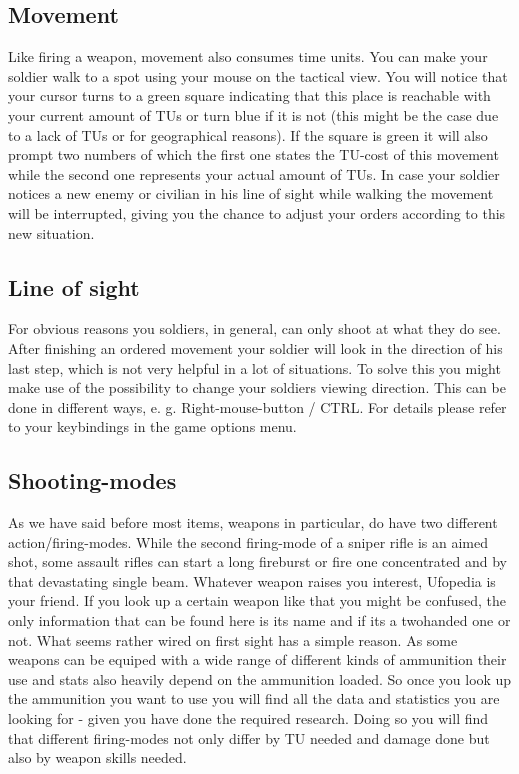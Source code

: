 \subsection{Movement}
Like firing a weapon, movement also consumes time units. You can make your soldier walk to a spot using your mouse on the tactical view. You will notice that your cursor turns to a green square indicating that this place is reachable with your current amount of TUs or turn blue if it is not (this might be the case due to a lack of TUs or for geographical reasons). If the square is green it will also prompt two numbers of which the first one states the TU-cost of this movement while the second one represents your actual amount of TUs. In case your soldier notices a new enemy or civilian in his line of sight while walking the movement will be interrupted, giving you the chance to adjust your orders according to this new situation.

\subsection{Line of sight}
For obvious reasons you soldiers, in general, can only shoot at what they do see. After finishing an ordered movement your soldier will look in the direction of his last step, which is not very helpful in a lot of situations. To solve this you might make use of the possibility to change your soldiers viewing direction. This can be done in different ways, e. g. Right-mouse-button / CTRL. For details please refer to your keybindings in the game options menu.

\subsection{Shooting-modes}
As we have said before most items, weapons in particular, do have two different action/firing-modes. While the second firing-mode of a sniper rifle is an aimed shot, some assault rifles can start a long fireburst or fire one concentrated and by that devastating single beam. Whatever weapon raises you interest, Ufopedia is your friend. If you look up a certain weapon like that you might be confused, the only information that can be found here is its name and if its a twohanded one or not. What seems rather wired on first sight has a simple reason. As some weapons can be equiped with a wide range of different kinds of ammunition their use and stats also heavily depend on the ammunition loaded. So once you look up the ammunition you want to use you will find all the data and statistics you are looking for - given you have done the required research. Doing so you will find that different firing-modes not only differ by TU needed and damage done but also by weapon skills needed.

